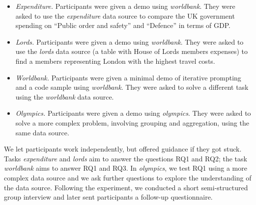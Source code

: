 \documentclass[manuscript,review,anonymous]{acmart}
\begin{document}
\begin{itemize}
\item \emph{Expenditure.} Participants were given a demo using \emph{worldbank}.
  They were asked to use the \emph{expenditure} data source to compare the UK government spending
  on ``Public order and safety'' and ``Defence'' in terms of GDP.
\item \emph{Lords.} Participants were given a demo using \emph{worldbank}.
  They were asked to use the \emph{lords} data source (a table with House of Lords
  members expenses) to find a members representing London with the highest travel costs.
\item \emph{Worldbank.} Participants were given a minimal demo of iterative prompting and
  a code sample using \emph{worldbank}. They were asked to solve a different task using
  the \emph{worldbank} data source.
\item \emph{Olympics.} Participants were given a demo using \emph{olympics}.
  They were asked to solve a more complex problem, involving grouping and aggregation,
  using the same data source.
\end{itemize}

\noindent
We let participants work independently, but offered guidance if they got stuck.
Tasks \emph{expenditure} and \emph{lords} aim to answer the questions RQ1 and RQ2; the task
\emph{worldbank} aims to answer RQ1 and RQ3. In \emph{olympics}, we test RQ1 using a more complex
data source and we ask further questions to explore the understanding of the data source. Following the
experiment, we conducted a short semi-structured group interview and later sent participants a follow-up
questionnaire.
\end{document}
